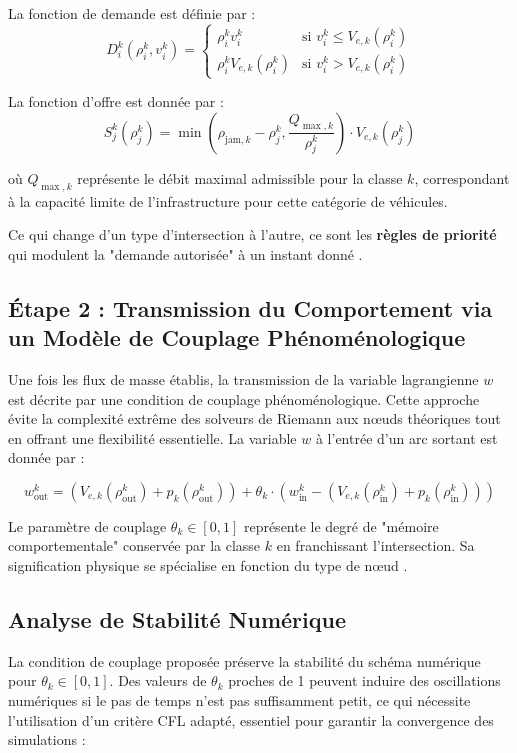 La fonction de demande est définie par :
\[
D_i^k(\rho_i^k, v_i^k) =
\begin{cases}
\rho_i^k v_i^k & \text{si } v_i^k \leq V_{e,k}(\rho_i^k) \\
\rho_i^k V_{e,k}(\rho_i^k) & \text{si } v_i^k > V_{e,k}(\rho_i^k)
\end{cases}
\]

La fonction d'offre est donnée par :
\[
S_j^k(\rho_j^k) = \min\left(\rho_{\text{jam},k} - \rho_j^k, \frac{Q_{\max,k}}{\rho_j^k}\right) \cdot V_{e,k}(\rho_j^k)
\]

où $ Q_{\max,k} $ représente le débit maximal admissible pour la classe $ k $, correspondant à la capacité limite de l'infrastructure pour cette catégorie de véhicules.

Ce qui change d'un type d'intersection à l'autre, ce sont les \textbf{règles de priorité} qui modulent la "demande autorisée" à un instant donné \cite{BressonPiccoli2019}.

\subsection{Étape 2 : Transmission du Comportement via un Modèle de Couplage Phénoménologique}
Une fois les flux de masse établis, la transmission de la variable lagrangienne $ w $ est décrite par une condition de couplage phénoménologique. Cette approche évite la complexité extrême des solveurs de Riemann aux nœuds théoriques \cite{GaravelloPiccoli2006, Pares2006PathConservative} tout en offrant une flexibilité essentielle. La variable $ w $ à l'entrée d'un arc sortant est donnée par :

\[
w_{\text{out}}^k = \left(V_{e,k}(\rho_{\text{out}}^k) + p_k(\rho_{\text{out}}^k)\right) + \theta_k \cdot \left(w_{\text{in}}^k - \left(V_{e,k}(\rho_{\text{in}}^k) + p_k(\rho_{\text{in}}^k)\right)\right)
\]

Le paramètre de couplage $ \theta_k \in [0,1] $ représente le degré de "mémoire comportementale" conservée par la classe $ k $ en franchissant l'intersection. Sa signification physique se spécialise en fonction du type de nœud \cite{HertyKlar2003}.

\subsection{Analyse de Stabilité Numérique}
La condition de couplage proposée préserve la stabilité du schéma numérique pour $ \theta_k \in [0,1] $. Des valeurs de $ \theta_k $ proches de 1 peuvent induire des oscillations numériques si le pas de temps n'est pas suffisamment petit, ce qui nécessite l'utilisation d'un critère CFL adapté, essentiel pour garantir la convergence des simulations :

